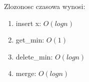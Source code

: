 \documentclass{article}
\begin{document}
Zlozonosc czasowa wynosi:

\begin{tcolorbox}[colback=white!90!blue,colframe=black!35!blue,title=]

    \begin{enumerate}[label=(\arabic*)]
        \item insert x: $O(logn)$
        \item get\_min: $O(1)$
        \item delete\_min: $O(logn)$
        \item merge: $O(logn)$
    
\end{enumerate}

\end{tcolorbox}
\end{document}
